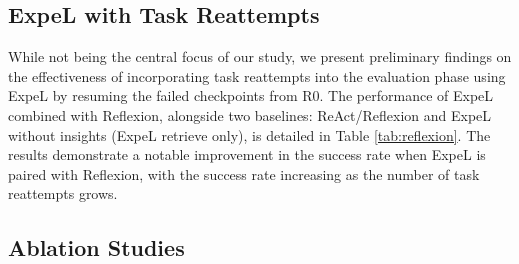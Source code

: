 \documentclass[letterpaper]{article} %
\begin{document}
\begin{table}
    \centering
    \caption{\textbf{Success Rate on ALFWorld with Reflexion Rounds.} ExpeL and Reflexion appear to be synergistic in the ALFWorld environment (\hl{Highlight} = ExpeL with one attempt). R1-R3 were obtained from failed R0 checkpoints.}
    \label{tab:reflexion}
\end{table}

\subsection{ExpeL with Task Reattempts}
While not being the central focus of our study, we present preliminary findings on the effectiveness of incorporating task reattempts into the evaluation phase using ExpeL by resuming the failed checkpoints from R0. The performance of ExpeL combined with Reflexion, alongside two baselines: ReAct/Reflexion and ExpeL without insights (ExpeL retrieve only), is detailed in Table \ref{tab:reflexion}. The results demonstrate a notable improvement in the success rate when ExpeL is paired with Reflexion, with the success rate increasing as the number of task reattempts grows.

\subsection{Ablation Studies}
\label{sec:ablation}
\end{document}
